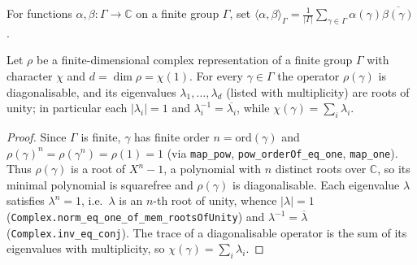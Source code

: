 \begin{definition}
    \label{def:inner-product}
    \leanok
    For functions $\alpha, \beta : \Gamma \to \mathbb{C}$ on a finite group
    $\Gamma$, set
    $\langle \alpha, \beta \rangle_\Gamma = \frac{1}{|\Gamma|} \sum_{\gamma \in
    \Gamma} \alpha(\gamma) \overline{\beta(\gamma)}$.
\end{definition}

\begin{lemma}
    \label{lem:rep-element-eigenvalues-roots-of-unity}
    Let $\rho$ be a finite-dimensional complex representation of a finite group
    $\Gamma$ with character $\chi$ and $d = \dim\rho = \chi(1)$. For every
    $\gamma \in \Gamma$ the operator $\rho(\gamma)$ is diagonalisable, and its
    eigenvalues $\lambda_1, \dots, \lambda_d$ (listed with multiplicity) are roots
    of unity; in particular each $|\lambda_i| = 1$ and
    $\lambda_i^{-1} = \overline{\lambda_i}$, while
    $\chi(\gamma) = \sum_{i} \lambda_i$.
\end{lemma}
\begin{proof}
    Since $\Gamma$ is finite, $\gamma$ has finite order $n = \mathrm{ord}(\gamma)$
    and $\rho(\gamma)^n = \rho(\gamma^n) = \rho(1) = 1$ (via \texttt{map\_pow},
    \texttt{pow\_orderOf\_eq\_one}, \texttt{map\_one}). Thus $\rho(\gamma)$ is a
    root of $X^n - 1$, a polynomial with $n$ distinct roots over $\mathbb{C}$, so
    its minimal polynomial is squarefree and $\rho(\gamma)$ is diagonalisable.
    Each eigenvalue $\lambda$ satisfies $\lambda^n = 1$, i.e.\ $\lambda$ is an
    $n$-th root of unity, whence $|\lambda| = 1$
    (\texttt{Complex.norm\_eq\_one\_of\_mem\_rootsOfUnity}) and
    $\lambda^{-1} = \overline{\lambda}$ (\texttt{Complex.inv\_eq\_conj}). The
    trace of a diagonalisable operator is the sum of its eigenvalues with
    multiplicity, so $\chi(\gamma) = \sum_i \lambda_i$.
\end{proof}

